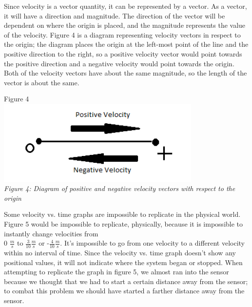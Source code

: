 \documentclass[aps,letterpaper,11pt]{revtex4}
\begin{document}
Since velocity is a vector quantity, it can be represented by a vector. As a vector, it will have a direction and magnitude. The direction of the vector will be dependent on where the origin is placed, and the magnitude represents the value of the velocity. Figure 4 is a diagram representing velocity vectors in respect to the origin; the diagram places the origin at the left-most point of the line and the positive direction to the right, so a positive velocity vector would point towards the positive direction and a negative velocity would point towards the origin. Both of the velocity vectors have about the same magnitude, so the length of the vector is about the same.

\newpage

\begin{center}
Figure 4\\
\includegraphics[width=4in]{VelocityVectorEx.png}\\
\textit{Figure 4: Diagram of positive and negative velocity vectors with respect to the origin}
\end{center}

\vspace{5mm}

Some velocity vs. time graphs are impossible to replicate in the physical world. Figure 5 would be impossible to replicate, physically, because it is impossible to instantly change velocities from \\0 $\frac{m}{s}$ to $\frac{3}{10} \frac{m}{s}$ or -$\frac{4}{10} \frac{m}{s}$. It's impossible to go from one velocity to a different velocity within no interval of time. Since the velocity vs. time graph doesn't show any positional values, it will not indicate where the system began or stopped. When attempting to replicate the graph in figure 5, we almost ran into the sensor because we thought that we had to start a certain distance away from the sensor; to combat this problem we should have started a farther distance away from the sensor.
\end{document}
